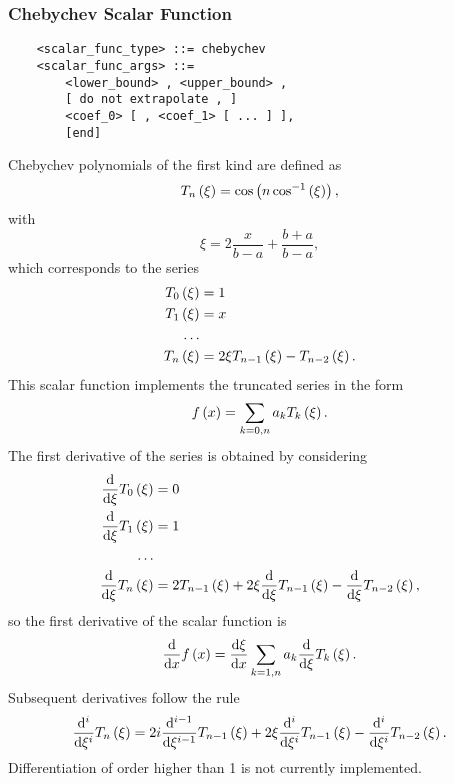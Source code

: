 \subsubsection{Chebychev Scalar Function}
\begin{verbatim}
    <scalar_func_type> ::= chebychev
    <scalar_func_args> ::= 
        <lower_bound> , <upper_bound> ,
        [ do not extrapolate , ]
        <coef_0> [ , <coef_1> [ ... ] ],
        [end]
\end{verbatim}
Chebychev polynomials of the first kind are defined as
\begin{equation}
	T_n\left( \xi \right) = \cos\left( n \cos^{-1}\left( \xi \right) \right) ,
\end{equation}
with
\begin{equation}
	\xi = 2 \frac{x}{b - a} + \frac{b + a}{b - a} ,
\end{equation}
which corresponds to the series
\begin{align}
	T_0\left( \xi \right) &= 1 \\
	T_1\left( \xi \right) &= x \\
	\ldots \nonumber \\
	T_n\left( \xi \right) &= 2 \xi T_{n-1}\left( \xi \right) - T_{n-2}\left( \xi \right) .
\end{align}
This scalar function implements the truncated series in the form
\begin{equation}
	f\left( x \right) = \sum_{k=0,n} a_k T_k\left( \xi \right) .
\end{equation}
The first derivative of the series is obtained by considering
\begin{align}
	\frac{\mathrm{d}}{\mathrm{d}\xi}T_0\left( \xi \right) &= 0 \\
	\frac{\mathrm{d}}{\mathrm{d}\xi}T_1\left( \xi \right) &= 1 \\
	\ldots \nonumber \\
	\frac{\mathrm{d}}{\mathrm{d}\xi}T_n\left( \xi \right) &= 
		2 T_{n-1}\left( \xi \right)
		+ 2 \xi \frac{\mathrm{d}}{\mathrm{d}\xi}T_{n-1}\left( \xi \right)
		- \frac{\mathrm{d}}{\mathrm{d}\xi}T_{n-2}\left( \xi \right) ,
\end{align}
so the first derivative of the scalar function is
\begin{equation}
	\frac{\mathrm{d}}{\mathrm{d}x}f\left( x \right) = \frac{\mathrm{d}\xi}{\mathrm{d}x} \sum_{k=1,n} a_k \frac{\mathrm{d}}{\mathrm{d}\xi} T_k\left( \xi \right) .
\end{equation}
Subsequent derivatives follow the rule
\begin{equation}
	\frac{\mathrm{d}^i}{\mathrm{d}\xi^i}T_n\left( \xi \right) = 
		2 i \frac{\mathrm{d}^{i-1}}{\mathrm{d}\xi^{i-1}}T_{n-1}\left( \xi \right)
		+ 2 \xi \frac{\mathrm{d}^i}{\mathrm{d}\xi^i}T_{n-1}\left( \xi \right)
		- \frac{\mathrm{d}^i}{\mathrm{d}\xi^i}T_{n-2}\left( \xi \right) .
\end{equation}
Differentiation of order higher than 1 is not currently implemented.




